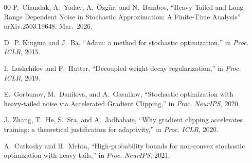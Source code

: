 \documentclass[conference]{IEEEtran}
\begin{document}
\begin{thebibliography}{00}
P.~Chandak, A.~Yadav, A.~\"{O}zg\"{u}r, and N.~Bambos,
``Heavy-Tailed and Long-Range Dependent Noise in Stochastic Approximation: A Finite-Time Analysis'' arXiv:2503.19648, Mar.~2026.

D.~P. Kingma and J.~Ba, ``Adam: a method for stochastic
optimization,'' in \textit{Proc. ICLR}, 2015.

I.~Loshchilov and F.~Hutter, ``Decoupled weight decay
regularization,'' in \textit{Proc. ICLR}, 2019.

E.~Gorbunov, M.~Danilova, and A.~Gasnikov, ``Stochastic optimization
with heavy-tailed noise via Accelerated Gradient Clipping,'' in
\textit{Proc. NeurIPS}, 2020.

J.~Zhang, T.~He, S.~Sra, and A.~Jadbabaie, ``Why gradient clipping
accelerates training: a theoretical justification for adaptivity,'' in
\textit{Proc. ICLR}, 2020.

A.~Cutkosky and H.~Mehta, ``High-probability bounds for non-convex
stochastic optimization with heavy tails,'' in \textit{Proc. NeurIPS},
2021.

\end{thebibliography}
\end{document}
